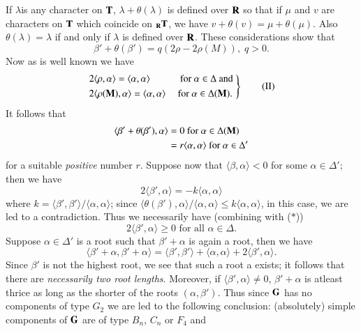 If $\lambda$\pageoriginale is any character on $\mathbf{T}$, $\lambda + \theta (\lambda)$ is defined over $\mathbf{R}$ so that if $\mu$ and $v$ are characters on $\mathbf{T}$ which coincide on ${}_{\mathbf{R}} \mathbf{T}$, we have $v+ \theta(v) = \mu + \theta(\mu)$. Also $\theta(\lambda) = \lambda$ if and only if $\lambda$ is defined over $\mathbf{R}$. These considerations show that 
$$
\beta' + \theta (\beta') = q (2\rho - 2 \rho (M)), \; q > 0.
$$
Now as is well known we have 
\begin{equation*}
\left. 
\begin{aligned}
& 2 \langle \rho, \alpha \rangle  = \langle \alpha, \alpha \rangle  \hspace{1cm} \text{ for } \alpha \in \Delta \text{ and }\\
&  2 \langle \rho (\mathbf{M}), \alpha \rangle  = \langle \alpha, \alpha \rangle  \quad \text{ for } \alpha \in \Delta (\mathbf{M}).
\end{aligned}
\right\}
\tag{II}
\end{equation*}
It follows that
\begin{align*}
\langle \beta' + \theta (\beta'), \alpha \rangle & = 0 \text{ for  } \alpha \in \Delta (\mathbf{M})\\
& = r \langle \alpha, \alpha \rangle \text{ for } \alpha \in \Delta'
\end{align*}
for a suitable \textit{ positive } number $r$. Suppose now that $\langle \beta, \alpha \rangle < 0$ for some $\alpha \in \Delta'$; then we have 
$$
2 \langle \beta', \alpha \rangle  = - k \langle \alpha, \alpha \rangle 
$$
where $k = \langle \beta', \beta' \rangle / \langle \alpha, \alpha \rangle $; since $\langle \theta (\beta'), \alpha \rangle / \langle \alpha, \alpha  \rangle \leqslant k \langle \alpha, \alpha \rangle $, in this case, we are led to a contradiction. Thus we necessarily have (combining with ($\ast$))
$$
2 \langle \beta', \alpha \rangle  \geqslant 0 \text{ for all } \alpha \in \Delta.
$$
Suppose $\alpha \in \Delta'$ is a root such that $\beta' + \alpha$  is again a root, then we have
$$
\langle \beta' + \alpha, \beta' + \alpha \rangle = \langle \beta', \beta' \rangle + \langle  \alpha, \alpha \rangle + 2 \langle \beta', \alpha \rangle .
$$
Since $\beta'$ is not the highest root, we see that such a root a exists; it follows that there are \textit{necessarily two root lengths}. Moreover, if $\langle \beta',\alpha \rangle \neq 0$, $\beta' + \alpha$ is atleast thrice as long as the shorter of the roots $(\alpha, \beta')$. Thus since $\mathbf{G}$ has no components of type $G_2$ we are led to the following conclusion: (absolutely) simple components of $\mathbf{G}$ are of type $B_n$, $C_n$ or $F_4$ and 
